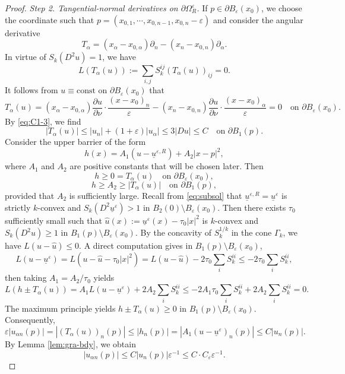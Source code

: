 \documentclass[reqno]{amsart}
\theoremstyle{remark}
\theoremstyle{definition}
\numberwithin{equation}{section}
\begin{document}
\begin{proof}
\textit{Step 2. Tangential-normal derivatives on $\partial\Omega_R^\varepsilon$.} If $p\in \partial B_\varepsilon(x_0)$, we choose the coordinate such that $p=(x_{0,1},\cdots,x_{0,n-1},x_{0,n}-\varepsilon)$ and consider the angular derivative
	\[
	T_{\alpha} = (x_{\alpha} - x_{0,\alpha})\partial_n - (x_n - x_{0,n})\partial_{\alpha}.
	\]
	In virtue of $S_k(D^2u)=1$, we have
	\[
	L(T_\alpha(u)):=\sum_{i,j} S_k^{ij}(T_{\alpha}(u))_{ij} = 0.
	\]
	It follows from $u\equiv\mathrm{const}$ on $\partial B_\varepsilon(x_0)$ that
	\[
	T_\alpha(u) = (x_\alpha - x_{0,\alpha}) \frac{\partial u}{\partial \nu} \cdot \frac{(x-x_0)_n}{\varepsilon} - (x_n - x_{0,n}) \frac{\partial u}{\partial \nu} \cdot \frac{(x-x_0)_\alpha}{\varepsilon} = 0\quad\text{on }\partial B_\varepsilon(x_0).
	\]
	By \eqref{eq:C1-3}, we find
	\[ |T_{\alpha}(u)| \leq |u_n| + (1+\varepsilon)|u_{\alpha}| \leq 3|Du| \leq C\quad\text{on }\partial B_1(p). \]
	Consider the upper barrier of the form 
	\[ 
	h(x) = A_1(u - \underline{u}^{\varepsilon,R}) + A_2|x - p|^2,
	\]
	where $A_1$ and $A_2$ are positive constants that will be chosen later. Then 
	\[h\geq0=T_\alpha(u)\quad\text{on }\partial B_\varepsilon(x_0),\]
	\[h\geq A_2\geq|T_\alpha(u)|\quad\text{on }\partial B_1(p),\]
	provided that $A_2$ is sufficiently large.
	Recall from \eqref{eq:subsol} that $\underline{u}^{\varepsilon,R}=\underline{u}^{\varepsilon}$ is strictly $k$-convex and $S_k(D^2\underline{u}^\varepsilon)>1$ in $B_2(0)\setminus B_\varepsilon(x_0)$. Then there exists $\tau_0$ sufficiently small such that $\hat{u}(x):=\underline{u}^{\varepsilon}(x)-\tau_0|x|^2$ is $k$-convex and $S_k(D^2\hat{u})\geq1$ in $B_1(p)\setminus B_\varepsilon(x_0)$. By the concavity of $S_k^{1/k}$ in the cone $\Gamma_k$, we have $L(u-\hat{u})\leq0$. A direct computation gives in $B_1(p)\setminus B_\varepsilon(x_0)$,
	\[
	L(u - \underline{u}^{\varepsilon}) = L(u - \hat{u} - \tau_0|x|^2) = L(u - \hat{u}) - 2\tau_0\sum_i S_k^{ii} \leq -2\tau_0\sum_i S_k^{ii},
	\]
	then taking $A_1 = A_2/\tau_0$ yields
  	\[
	L(h \pm T_{\alpha}(u)) = A_1 L(u - \underline{u}^{\varepsilon}) + 2A_2 \sum_i S_k^{ii} \leq -2A_1\tau_0\sum_i  S_k^{ii} + 2A_2 \sum_i S_k^{ii}=0.
	\]
	The maximum principle yields $h \pm T_{\alpha}(u) \geq 0$ in $B_1(p)\setminus B_\varepsilon(x_0)$.
	Consequently, 
	\[\varepsilon|u_{\alpha n}(p)|=  
	|(T_{\alpha}(u))_n(p)| \leq |h_n(p)| = |A_1(u - \underline{u}^{\varepsilon})_n(p)|\leq C|u_n(p)|.
	\]
	By Lemma \ref{lem:gra-bdy}, we obtain
	\begin{equation}\label{eq:TN-1}
		|u_{\alpha n}(p)|\leq C |u_n(p)|\varepsilon^{-1} \leq C \cdot C_\varepsilon\varepsilon^{-1}. 
	\end{equation}


\end{proof}
\end{document}
